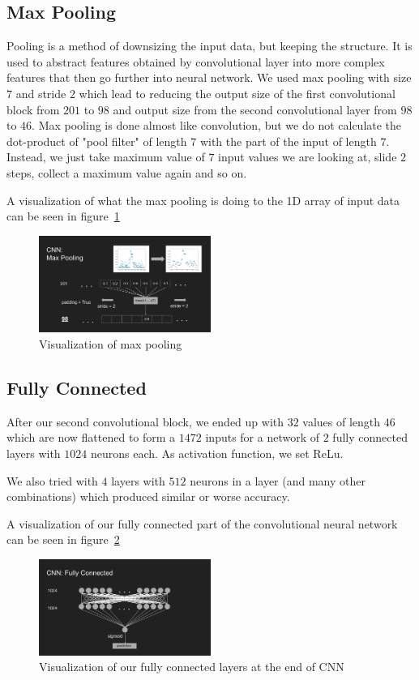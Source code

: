 \documentclass[twoside]{article}
\begin{document}
\begin{multicols}{2}
\subsection{Max Pooling}
Pooling is a method of downsizing the input data, but keeping the structure. It is used to abstract features obtained by convolutional layer into more complex features that then go further into neural network. We used max pooling with size $7$ and stride $2$ which lead to reducing the output size of the first convolutional block from $201$ to $98$ and output size from the second convolutional layer from $98$ to $46$. Max pooling is done almost like convolution, but we do not calculate the dot-product of "pool filter" of length $7$ with the part of the input of length $7$. Instead, we just take maximum value of $7$ input values we are looking at, slide $2$ steps, collect a maximum value again and so on.

A visualization of what the max pooling is doing to the 1D array of input data can be seen in figure~\ref{fig:max_pooling}
\begin{figure}[H]
\includegraphics[width=0.5\textwidth]{max_pooling}
\caption{Visualization of max pooling}
\label{fig:max_pooling}
\end{figure}

\subsection{Fully Connected}
After our second convolutional block, we ended up with $32$ values of length $46$ which are now flattened to form a $1472$ inputs for a network of $2$ fully connected layers with $1024$ neurons each. As activation function, we set ReLu.

We also tried with $4$ layers with $512$ neurons in a layer (and many other combinations) which produced similar or worse accuracy.

A visualization of our fully connected part of the convolutional neural network can be seen in figure~\ref{fig:cnn_fc}
\begin{figure}[H]
\includegraphics[width=0.5\textwidth]{cnn_fc}
\caption{Visualization of our fully connected layers at the end of CNN}
\label{fig:cnn_fc}
\end{figure}


\end{multicols}
\end{document}
